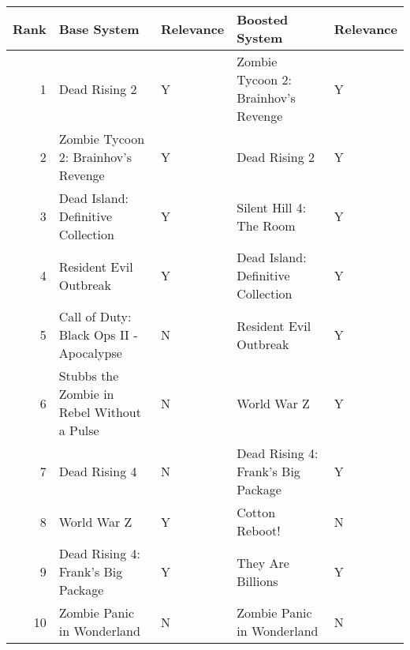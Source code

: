 \begin{tabular}{rllll}
\toprule
 Rank &                                Base System & Relevance &                      Boosted System & Relevance \\
\midrule
    1 &                              Dead Rising 2 &         Y & Zombie Tycoon 2: Brainhov's Revenge &         Y \\
    2 &        Zombie Tycoon 2: Brainhov's Revenge &         Y &                       Dead Rising 2 &         Y \\
    3 &         Dead Island: Definitive Collection &         Y &             Silent Hill 4: The Room &         Y \\
    4 &                     Resident Evil Outbreak &         Y &  Dead Island: Definitive Collection &         Y \\
    5 &    Call of Duty: Black Ops II - Apocalypse &         N &              Resident Evil Outbreak &         Y \\
    6 & Stubbs the Zombie in Rebel Without a Pulse &         N &                         World War Z &         Y \\
    7 &                              Dead Rising 4 &         N &  Dead Rising 4: Frank's Big Package &         Y \\
    8 &                                World War Z &         Y &                      Cotton Reboot! &         N \\
    9 &         Dead Rising 4: Frank's Big Package &         Y &                   They Are Billions &         Y \\
   10 &                 Zombie Panic in Wonderland &         N &          Zombie Panic in Wonderland &         N \\
\bottomrule
\end{tabular}
